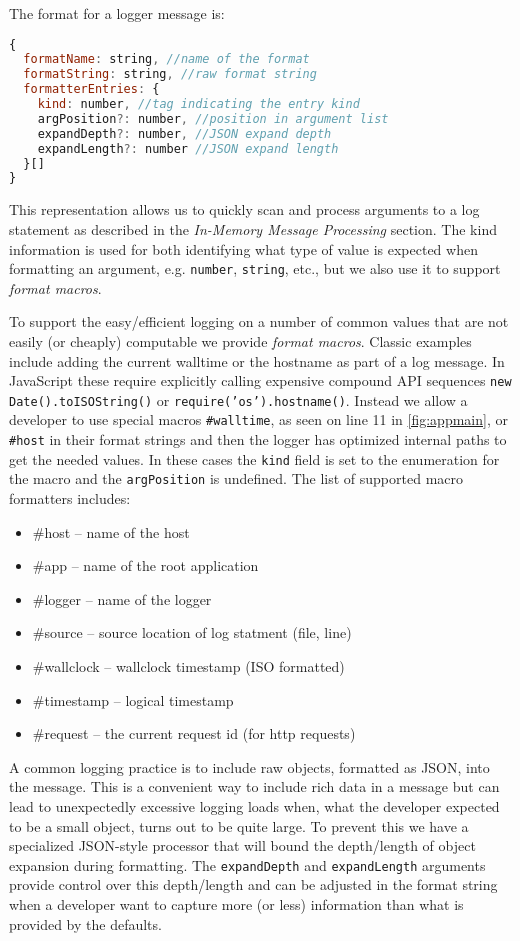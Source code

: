 \noindent
The format for a logger message is:
\begin{lstlisting}[language=JavaScript,basicstyle=\scriptsize]
{
  formatName: string, //name of the format
  formatString: string, //raw format string
  formatterEntries: {
    kind: number, //tag indicating the entry kind
    argPosition?: number, //position in argument list
    expandDepth?: number, //JSON expand depth
    expandLength?: number //JSON expand length
  }[]
}
\end{lstlisting}

This representation allows us to quickly scan and process arguments to a log statement as 
described in the \emph{In-Memory Message  Processing} section. The kind 
information is used for both identifying what type of value is expected 
when formatting an argument, e.g. \texttt{number}, \texttt{string}, etc., 
but we also use it to support \emph{format macros}.

To support the easy/efficient logging on a number of common values that 
are not easily (or cheaply) computable we provide \emph{format macros}. 
Classic examples include adding the current walltime or the hostname as 
part of a log message. In JavaScript these require explicitly calling 
expensive compound API sequences \texttt{new Date().toISOString()} or 
\texttt{require('os').hostname()}. Instead we allow a developer to use 
special macros \texttt{\#walltime}, as seen on line 11 in \autoref{fig:appmain}, 
or \texttt{\#host} in their format 
strings and then the logger has optimized internal paths to get the needed 
values. In these cases the \texttt{kind} field is set to the enumeration 
for the macro and the \texttt{argPosition} is undefined. The list of supported 
macro formatters includes:
\begin{itemize}
  \item \#host -- name of the host
  \item \#app -- name of the root application
  \item \#logger -- name of the logger
  \item \#source -- source location of log statment (file, line)
  \item \#wallclock -- wallclock timestamp (ISO formatted)
  \item \#timestamp -- logical timestamp
  \item \#request   -- the current request id (for http requests)
\end{itemize}

A common logging practice is to include raw objects, formatted as JSON, into the 
message. This is a convenient way to include rich data in a message but can 
lead to unexpectedly excessive logging loads when, what the developer expected to 
be a small object, turns out to be quite large. To prevent this we have a specialized 
JSON-style processor that will bound the depth/length of object expansion during 
formatting. The \texttt{expandDepth} and \texttt{expandLength} arguments provide 
control over this depth/length and can be adjusted in the format string when a 
developer want to capture more (or less) information than what is provided by the 
defaults.

